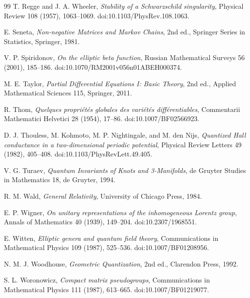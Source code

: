 \documentclass[11pt]{article}
\theoremstyle{definition}
\begin{document}
\begin{thebibliography}{99}
T. Regge and J. A. Wheeler,
\emph{Stability of a Schwarzschild singularity},
Physical Review 108 (1957), 1063--1069.
doi:10.1103/PhysRev.108.1063.

E. Seneta,
\emph{Non-negative Matrices and Markov Chains}, 2nd ed.,
Springer Series in Statistics, Springer, 1981.

V. P. Spiridonov,
\emph{On the elliptic beta function},
Russian Mathematical Surveys 56 (2001), 185--186.
doi:10.1070/RM2001v056n01ABEH000374.

M. E. Taylor,
\emph{Partial Differential Equations I: Basic Theory}, 2nd ed.,
Applied Mathematical Sciences 115, Springer, 2011.

R. Thom,
\emph{Quelques propri\'et\'es globales des vari\'et\'es diff\'erentiables},
Commentarii Mathematici Helvetici 28 (1954), 17--86.
doi:10.1007/BF02566923.

D. J. Thouless, M. Kohmoto, M. P. Nightingale, and M. den Nijs,
\emph{Quantized Hall conductance in a two-dimensional periodic potential},
Physical Review Letters 49 (1982), 405--408.
doi:10.1103/PhysRevLett.49.405.

V. G. Turaev,
\emph{Quantum Invariants of Knots and 3-Manifolds},
de Gruyter Studies in Mathematics 18, de Gruyter, 1994.

R. M. Wald,
\emph{General Relativity},
University of Chicago Press, 1984.

E. P. Wigner,
\emph{On unitary representations of the inhomogeneous Lorentz group},
Annals of Mathematics 40 (1939), 149--204.
doi:10.2307/1968551.

E. Witten,
\emph{Elliptic genera and quantum field theory},
Communications in Mathematical Physics 109 (1987), 525--536.
doi:10.1007/BF01208956.

N. M. J. Woodhouse,
\emph{Geometric Quantization}, 2nd ed.,
Clarendon Press, 1992.

S. L. Woronowicz,
\emph{Compact matrix pseudogroups},
Communications in Mathematical Physics 111 (1987), 613--665.
doi:10.1007/BF01219077.

\end{thebibliography}
\end{document}
